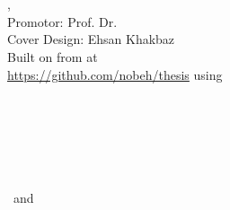 \hfill
\vfill
{
	\small
	\textbf{\thesisName} \\
	\textit{\thesisTitle} \\
	\thesisSubject, \thesisDate \\
	Promotor: Prof. Dr. \thesisFirstReviewer \\
	Cover Design: Ehsan Khakbaz  \\[2em]
	Built on \jtt{\gitAuthorIsoDate} from \jtt{\gitHash} at \\
	\url{https://github.com/nobeh/thesis} using \\[1.5em]
	\pdftexbanner \\[2em]
	\textbf{\thesisUniversity} \\
	\textit{\thesisUniversityGroup} \\
	\thesisUniversityInstitute \\
	\thesisUniversityDepartment \\
	\thesisUniversityStreetAddress \\
	\thesisUniversityPostalCode\ and \thesisUniversityCity
}
